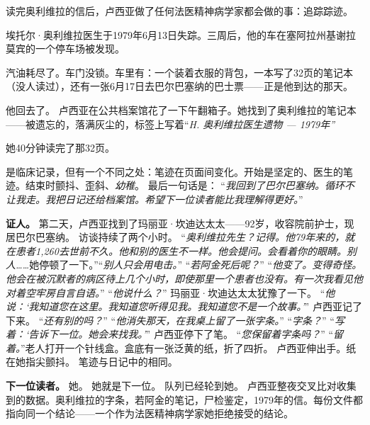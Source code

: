 {\noindent 读完奥利维拉的信后，卢西亚做了任何法医精神病学家都会做的事：追踪踪迹。

\noindent 埃托尔·奥利维拉医生于1979年6月13日失踪。三周后，他的车在塞阿拉州基谢拉莫宾的一个停车场被发现。

\noindent 汽油耗尽了。车门没锁。车里有：一个装着衣服的背包，一本写了32页的笔记本（没人读过），还有一张6月17日去巴尔巴塞纳的巴士票——正是他到达的那天。

\noindent 他回去了。
\noindent 卢西亚在公共档案馆花了一下午翻箱子。她找到了奥利维拉的笔记本——被遗忘的，落满灰尘的，标签上写着\textquotedblleft{\textit{H. 奥利维拉医生遗物 --- 1979年\textquotedblright}}

\noindent 她40分钟读完了那32页。

\noindent 是临床记录，但有一个不同之处：笔迹在页面间变化。开始是坚定的、医生的笔迹。结束时颤抖、歪斜、\textit{幼稚}。
\noindent 最后一句话是：
\noindent “\textit{我回到了巴尔巴塞纳。循环不让我走。我把日记还给档案馆。希望下一位读者能比我理解得更好。}”

\noindent \textbf{证人。}
\noindent 第二天，卢西亚找到了玛丽亚·坎迪达太太——92岁，收容院前护士，现居巴尔巴塞纳。
\noindent 访谈持续了两个小时。
\noindent \textquotedblleft{\textit{奥利维拉先生？记得。他79年来的，就在患者1,260去世前不久。他和别的医生不一样。他会提问。会看着你的眼睛。别人……}她停顿了一下。\textquotedblright{}}\textquotedblleft{\textit{别人只会用电击。}\textquotedblright{}}
\noindent \textquotedblleft{\textit{若阿金死后呢？}\textquotedblright{}}
\noindent \textquotedblleft{\textit{他变了。变得奇怪。他会在被沉默者的病区待上几个小时，即使那里一个患者也没有。有一次我看见他对着空牢房自言自语。}\textquotedblright{}}
\noindent \textquotedblleft{\textit{他说什么？}\textquotedblright{}}
\noindent 玛丽亚·坎迪达太太犹豫了一下。
\noindent “\textit{他说：‘我知道您在这里。我知道您听得见我。我知道您不是一个故事。’}”
\noindent 卢西亚记了下来。
\noindent \textquotedblleft{\textit{还有别的吗？}\textquotedblright{}}
\noindent \textquotedblleft{\textit{他消失那天，在我桌上留了一张字条。}\textquotedblright{}}
\noindent \textquotedblleft{\textit{字条？}\textquotedblright{}}
\noindent “\textit{写着：‘告诉下一位。她会来找我。’}”
\noindent 卢西亚停下了笔。
\noindent \textquotedblleft{\textit{您保留着字条吗？}\textquotedblright{}}
\noindent \textquotedblleft{\textit{留着。}\textquotedblright}老人打开一个针线盒。盒底有一张泛黄的纸，折了四折。
\noindent 卢西亚伸出手。纸在她指尖颤抖。
\noindent 笔迹与日记中的相同。

\noindent \textbf{下一位读者。}
\noindent 她。
\noindent 她就是下一位。
\noindent 队列已经轮到她。
\noindent 卢西亚整夜交叉比对收集到的数据。奥利维拉的字条，若阿金的笔记，尸检鉴定，1979年的信。每份文件都指向同一个结论——一个作为法医精神病学家她拒绝接受的结论。

}
